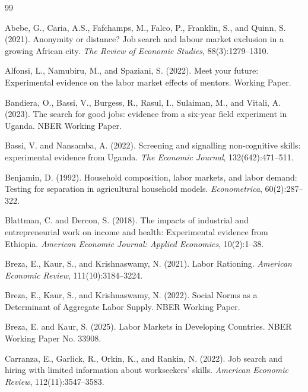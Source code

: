 \documentclass[12pt,a4paper]{article}
\begin{document}

\begin{thebibliography}{99}

Abebe, G., Caria, A.S., Fafchamps, M., Falco, P., Franklin, S., and Quinn, S. (2021).
Anonymity or distance? Job search and labour market exclusion in a growing African city.
\textit{The Review of Economic Studies}, 88(3):1279--1310.

Alfonsi, L., Namubiru, M., and Spaziani, S. (2022).
Meet your future: Experimental evidence on the labor market effects of mentors.
Working Paper.

Bandiera, O., Bassi, V., Burgess, R., Rasul, I., Sulaiman, M., and Vitali, A. (2023).
The search for good jobs: evidence from a six-year field experiment in Uganda.
NBER Working Paper.

Bassi, V. and Nansamba, A. (2022).
Screening and signalling non-cognitive skills: experimental evidence from Uganda.
\textit{The Economic Journal}, 132(642):471--511.

Benjamin, D. (1992).
Household composition, labor markets, and labor demand: Testing for separation in agricultural household models.
\textit{Econometrica}, 60(2):287--322.

Blattman, C. and Dercon, S. (2018).
The impacts of industrial and entrepreneurial work on income and health: Experimental evidence from Ethiopia.
\textit{American Economic Journal: Applied Economics}, 10(2):1--38.

Breza, E., Kaur, S., and Krishnaswamy, N. (2021).
Labor Rationing.
\textit{American Economic Review}, 111(10):3184--3224.

Breza, E., Kaur, S., and Krishnaswamy, N. (2022).
Social Norms as a Determinant of Aggregate Labor Supply.
NBER Working Paper.

Breza, E. and Kaur, S. (2025).
Labor Markets in Developing Countries.
NBER Working Paper No. 33908.

Carranza, E., Garlick, R., Orkin, K., and Rankin, N. (2022).
Job search and hiring with limited information about workseekers' skills.
\textit{American Economic Review}, 112(11):3547--3583.


\end{thebibliography}
\end{document}
